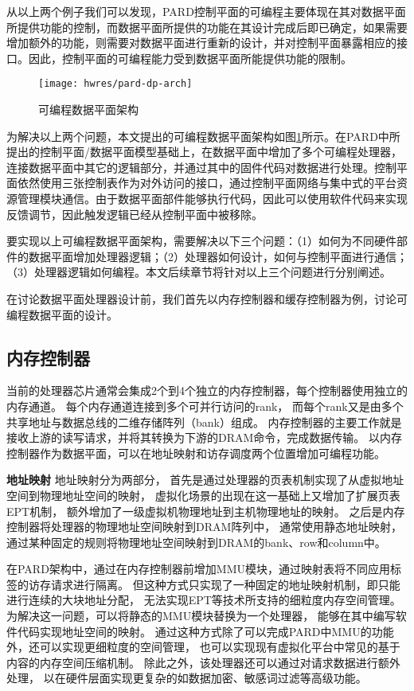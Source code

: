 从以上两个例子我们可以发现，PARD控制平面的可编程主要体现在其对数据平面所提供功能的控制，而数据平面所提供的功能在其设计完成后即已确定，如果需要增加额外的功能，则需要对数据平面进行重新的设计，并对控制平面暴露相应的接口。因此，控制平面的可编程能力受到数据平面所能提供功能的限制。

\begin{figure}[tb]
  \centering
  \texttt{[image: hwres/pard-dp-arch]}
  \caption{可编程数据平面架构}
  \label{fig:pard-dp-arch}
\end{figure}

为解决以上两个问题，本文提出的可编程数据平面架构如图\ref{fig:pard-dp-arch}所示。在PARD中所提出的控制平面/数据平面模型基础上，在数据平面中增加了多个可编程处理器，连接数据平面中其它的逻辑部分，并通过其中的固件代码对数据进行处理。控制平面依然使用三张控制表作为对外访问的接口，通过控制平面网络与集中式的平台资源管理模块通信。由于数据平面部件能够执行代码，因此可以使用软件代码来实现反馈调节，因此触发逻辑已经从控制平面中被移除。
 
要实现以上可编程数据平面架构，需要解决以下三个问题：（1）如何为不同硬件部件的数据平面增加处理器逻辑；（2）处理器如何设计，如何与控制平面进行通信；（3）处理器逻辑如何编程。本文后续章节将针对以上三个问题进行分别阐述。

在讨论数据平面处理器设计前，我们首先以内存控制器和缓存控制器为例，讨论可编程数据平面的设计。

\subsection{内存控制器}
当前的处理器芯片通常会集成2个到4个独立的内存控制器，每个控制器使用独立的内存通道。
每个内存通道连接到多个可并行访问的rank，
而每个rank又是由多个共享地址与数据总线的二维存储阵列（bank）组成。
内存控制器的主要工作就是接收上游的读写请求，并将其转换为下游的DRAM命令，完成数据传输。
以内存控制器作为数据平面，可以在地址映射和访存调度两个位置增加可编程功能。

\textbf{地址映射}\quad
地址映射分为两部分，
首先是通过处理器的页表机制实现了从虚拟地址空间到物理地址空间的映射，
虚拟化场景的出现在这一基础上又增加了扩展页表EPT机制，
额外增加了一级虚拟机物理地址到主机物理地址的映射。
之后是内存控制器将处理器的物理地址空间映射到DRAM阵列中，
通常使用静态地址映射，通过某种固定的规则将物理地址空间映射到DRAM的bank、row和column中。

在PARD架构中，通过在内存控制器前增加MMU模块，通过映射表将不同应用标签的访存请求进行隔离。
但这种方式只实现了一种固定的地址映射机制，即只能进行连续的大块地址分配，
无法实现EPT等技术所支持的细粒度内存空间管理。
为解决这一问题，可以将静态的MMU模块替换为一个处理器，
能够在其中编写软件代码实现地址空间的映射。
通过这种方式除了可以完成PARD中MMU的功能外，还可以实现更细粒度的空间管理，
也可以实现现有虚拟化平台中常见的基于内容的内存空间压缩机制。
除此之外，该处理器还可以通过对请求数据进行额外处理，
以在硬件层面实现更复杂的如数据加密、敏感词过滤等高级功能。

